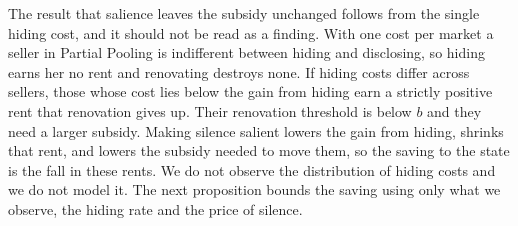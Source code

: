 The result that salience leaves the subsidy unchanged follows from the single hiding cost, and it should not be read as a finding. With one cost per market a seller in Partial Pooling is indifferent between hiding and disclosing, so hiding earns her no rent and renovating destroys none. If hiding costs differ across sellers, those whose cost lies below the gain from hiding earn a strictly positive rent that renovation gives up. Their renovation threshold is below $b$ and they need a larger subsidy. Making silence salient lowers the gain from hiding, shrinks that rent, and lowers the subsidy needed to move them, so the saving to the state is the fall in these rents. We do not observe the distribution of hiding costs and we do not model it. The next proposition bounds the saving using only what we observe, the hiding rate and the price of silence.
